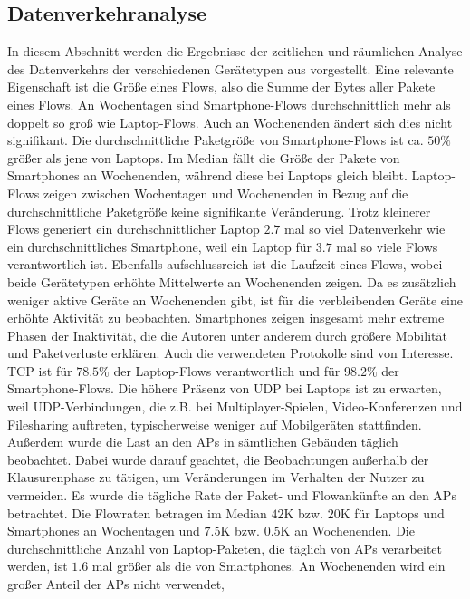 \documentclass[12pt, a4paper]{article}
\begin{document}
\subsection{Datenverkehranalyse}
\label{sec:phase2_b}

In diesem Abschnitt werden die Ergebnisse der zeitlichen und räumlichen Analyse des Datenverkehrs der verschiedenen Gerätetypen
aus \cite{Alipour2018} vorgestellt. Eine relevante Eigenschaft ist die Größe eines Flows, also die Summe der Bytes aller
Pakete eines Flows. An Wochentagen sind Smartphone-Flows durchschnittlich mehr als doppelt so groß wie Laptop-Flows.
Auch an Wochenenden ändert sich dies nicht signifikant. Die durchschnittliche Paketgröße von Smartphone-Flows
ist ca. $50 \%$ größer als jene von Laptops. Im Median fällt die Größe der Pakete von Smartphones an Wochenenden, 
während diese bei Laptops gleich bleibt. Laptop-Flows zeigen zwischen Wochentagen und Wochenenden in Bezug auf die 
durchschnittliche Paketgröße keine signifikante Veränderung. Trotz kleinerer Flows generiert ein durchschnittlicher Laptop $2.7$
mal so viel Datenverkehr wie ein durchschnittliches Smartphone, weil ein Laptop für $3.7$ mal so viele Flows verantwortlich ist.
Ebenfalls aufschlussreich ist die Laufzeit eines Flows, wobei beide Gerätetypen erhöhte Mittelwerte an Wochenenden zeigen.
Da es zusätzlich weniger aktive Geräte an Wochenenden gibt, ist für die verbleibenden Geräte eine erhöhte Aktivität
zu beobachten. Smartphones zeigen insgesamt mehr extreme Phasen der Inaktivität, die die Autoren unter anderem durch größere
Mobilität und Paketverluste erklären. Auch die verwendeten Protokolle sind von Interesse. 
TCP ist für $78.5 \%$ der Laptop-Flows verantwortlich und für $98.2 \%$ der Smartphone-Flows. 
Die höhere Präsenz von UDP bei Laptops ist zu erwarten, weil UDP-Verbindungen, die z.B. bei Multiplayer-Spielen, 
Video-Konferenzen und Filesharing auftreten, typischerweise weniger auf Mobilgeräten stattfinden. \cite{Alipour2018}
Außerdem wurde die Last an den APs in sämtlichen Gebäuden täglich beobachtet. Dabei wurde darauf geachtet,
die Beobachtungen außerhalb der Klausurenphase zu tätigen, um Veränderungen im Verhalten der Nutzer zu vermeiden.
Es wurde die tägliche Rate der Paket- und Flowankünfte an den APs betrachtet. Die Flowraten betragen im Median
$42$\textsc{K} bzw. $20$\textsc{K} für Laptops und Smartphones an Wochentagen und $7.5$\textsc{K} bzw. $0.5$\textsc{K}
an Wochenenden. Die durchschnittliche Anzahl von Laptop-Paketen, die täglich von APs verarbeitet werden,
ist $1.6$ mal größer als die von Smartphones. An Wochenenden wird ein großer Anteil der APs nicht verwendet,
\end{document}

